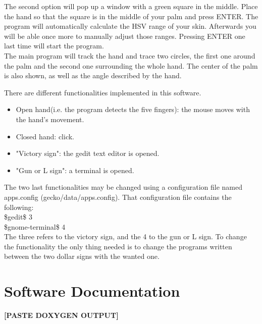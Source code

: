 \documentclass{article}
\begin{document}
The second option will pop up a window with a green square in the middle. Place the hand so that the square is in the middle of your palm and press ENTER. The program will automatically calculate the HSV range of your skin. Afterwards you will be able once more to manually adjust those ranges. Pressing ENTER one last time will start the program. 
\\
 
The main program will track the hand and trace two circles, the first one around the palm and the second one surrounding the whole hand. The center of the palm is also shown, as well as the angle described by the hand. 

There are different functionalities implemented in this software. 
\begin{itemize}
\item Open hand(i.e. the program detects the five fingers): the mouse moves with the hand's movement.
\item Closed hand: click.
\item "Victory sign": the gedit text editor is opened.
\item "Gun or L sign": a terminal is opened. 
\end{itemize}

The two last functionalities may be changed using a configuration file named apps.config (gecko/data/apps.config). 
That configuration file contains the following:
\\[0.5cm]
\$gedit\$ 3 \\
\$gnome-terminal\$ 4
\\[0.5cm]
The three refers to the victory sign, and the 4 to the gun or L sign. To change the functionality the only thing needed is to change the programs written between the two dollar signs with the wanted one. 


\section{Software Documentation}
\textbf{[PASTE DOXYGEN OUTPUT]}
\end{document}
